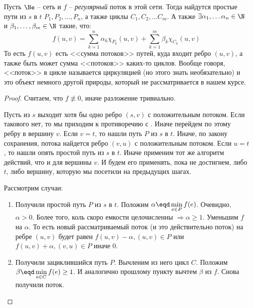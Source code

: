  Пусть $\Ne$ -- сеть и $f$ -- \textit{регулярный} поток в этой сети. Тогда найдутся простые пути из $s$ в $t$ $P_1, P_2, \dots, P_n$, а также циклы $C_1, C_2, \dots C_m$.
А также $\exists \alpha_1, \dots \alpha_n \in \N$ и $\beta_1, \dots, \beta_m \in \N$ такие, что:
\begin{equation*}
    f(u, v) = \sum\limits_{k = 1}^n \alpha_k \chi_{P_k}(u, v) + \sum\limits_{k = 1}^m \beta_k \chi_{C_k}(u, v)
\end{equation*}
То есть $f(u, v)$ есть <<сумма потоков>> путей, куда входит ребро $(u, v)$, а также быть может сумма <<потоков>> каких-то циклов.
Вообще говоря, <<поток>> в цикле называется циркуляцией (но этого знать необязательно) и это объект немного другой природы, который не рассматривается в нашем курсе.
\begin{proof}
Считаем, что $f \not\equiv 0$, иначе разложение тривиально.

Пусть из $s$ выходит хотя бы одно ребро $(s, v)$ с положительным потоком. Если такового нет, то мы приходим к противоречию с  . Иначе перейдем по этому ребру в вершину $v$. 
Если $v = t$, то нашли путь $P$ из $s$ в $t$. Иначе, по закону сохранения, потока найдется ребро $(v, u)$ с положительным потоком. Если $u = t$, то нашли опять простой путь из $s$ в $t$. Иначе применим тот же алгоритм действий, что и для вершины $v$. И будем его применять, пока не достигнем, либо $t$, либо вершину, которую мы посетили на предыдущих шагах.

Рассмотрим случаи:
\begin{enumerate}
    \item Получили простой путь $P$ из $s$ в $t$. Положим $\alpha \eqd \min\limits_{e \in P} f(e)$. Очевидно, $\alpha > 0$. Более того, коль скоро емкости целочисленны $\Rightarrow \alpha \geq 1$. Уменьшим $f$ на $\alpha$. То есть новый рассматриваемый поток (и это действительно поток) на ребре $(u, v)$ будет равен $f(u, v) - \alpha, (u, v) \in P$ или $f(u, v) + \alpha, (v, u) \in P$ иначе $0$.
    \item Получили зациклившийся путь $P$. Вычленим из него цикл $C$. Положим $\beta \eqd \min\limits_{e \in C} f(e) \geq 1$. И аналогично прошлому пункту вычтем $\beta$ из $f$. Снова получили поток.
\end{enumerate}


\end{proof}

